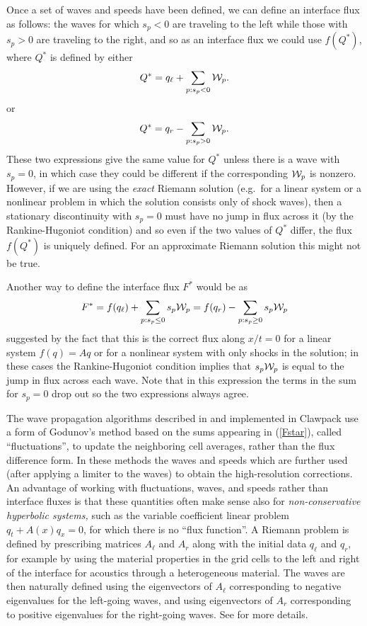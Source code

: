 \documentclass{SIAMbook2016}
\begin{document}
Once a set of waves and speeds have been defined, we can define an
interface flux as follows: the waves for which \(s_p < 0\) are traveling
to the left while those with \(s_p>0\) are traveling to the right, and
so as an interface flux we could use \(f(Q^*)\), where \(Q^*\) is
defined by either \[
Q^* = q_\ell + \sum_{p: s_p < 0} {\cal W}_p.
\] or \[
Q^* = q_r - \sum_{p: s_p > 0} {\cal W}_p.
\] These two expressions give the same value for \(Q^*\) unless there is
a wave with \(s_p=0\), in which case they could be different if the
corresponding \({\cal W}_p\) is nonzero. However, if we are using the
\emph{exact} Riemann solution (e.g.~for a linear system or a nonlinear
problem in which the solution consists only of shock waves), then a
stationary discontinuity with \(s_p=0\) must have no jump in flux across
it (by the Rankine-Hugoniot condition) and so even if the two values of
\(Q^*\) differ, the flux \(f(Q^*)\) is uniquely defined. For an
approximate Riemann solution this might not be true.

Another way to define the interface flux \(F^*\) would be as
\begin{align}\label{Fstar}
F^* = f(q_\ell) + \sum_{p: s_p \leq 0} s_p{\cal W}_p
= f(q_r) - \sum_{p: s_p \geq 0} s_p{\cal W}_p
\end{align} suggested by the fact that this is the correct flux along
\(x/t = 0\) for a linear system \(f(q)=Aq\) or for a nonlinear system
with only shocks in the solution; in these cases the Rankine-Hugoniot
condition implies that \(s_p{\cal W}_p\) is equal to the jump in flux
across each wave. Note that in this expression the terms in the sum for
\(s_p=0\) drop out so the two expressions always agree.

The wave propagation algorithms described in \cite{fvmhp} and
implemented in Clawpack use a form of Godunov's method based on the sums
appearing in (\ref{Fstar}), called ``fluctuations'', to update the
neighboring cell averages, rather than the flux difference form. In
these methods the waves and speeds which are further used (after
applying a limiter to the waves) to obtain the high-resolution
corrections. An advantage of working with fluctuations, waves, and
speeds rather than interface fluxes is that these quantities often make
sense also for \emph{non-conservative hyperbolic systems,} such as the
variable coefficient linear problem \(q_t + A(x)q_x = 0\), for which
there is no ``flux function''. A Riemann problem is defined by
prescribing matrices \(A_\ell\) and \(A_r\) along with the initial data
\(q_\ell\) and \(q_r\), for example by using the material properties in
the grid cells to the left and right of the interface for acoustics
through a heterogeneous material. The waves are then naturally defined
using the eigenvectors of \(A_\ell\) corresponding to negative
eigenvalues for the left-going waves, and using eigenvectors of \(A_r\)
corresponding to positive eigenvalues for the right-going waves. See
\cite{fvmhp} for more details.
\end{document}
